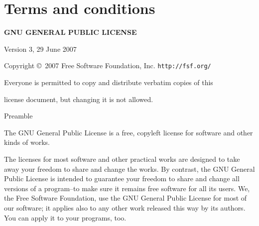 
\chapter{Terms and conditions}
\label{app:gpl}

\centerline{\large\textbf{GNU GENERAL PUBLIC LICENSE}}

\centerline{Version 3, 29 June 2007}

\begin{center}
	{\parindent 0in
		
		Copyright \copyright\  2007 Free Software Foundation, Inc. \texttt{http://fsf.org/}
		
		\bigskip
		Everyone is permitted to copy and distribute verbatim copies of this
		
		license document, but changing it is not allowed.}
	
\end{center}

\begin{center}
	Preamble
\end{center}
	The GNU General Public License is a free, copyleft license for
	software and other kinds of works.
	
	The licenses for most software and other practical works are designed
	to take away your freedom to share and change the works.  By contrast,
	the GNU General Public License is intended to guarantee your freedom to
	share and change all versions of a program--to make sure it remains free
	software for all its users.  We, the Free Software Foundation, use the
	GNU General Public License for most of our software; it applies also to
	any other work released this way by its authors.  You can apply it to
	your programs, too.
	

